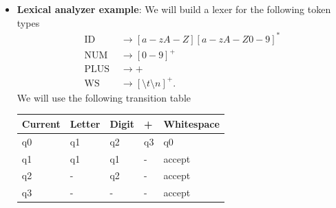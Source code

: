 \documentclass{report}
\begin{document}
\begin{itemize}
\begin{enumerate}
                \item Track the last accepting state
                \item When no transition is possible:
                    \begin{itemize}
                        \item Backtrack to last accepting state
                        \item Emit the corresponding token
                        \item Restart from next input position
                    \end{itemize}
            \end{enumerate}
            \textbf{Note:} You use a finite automaton to extract the tokens. The FA operations on raw characters.
            \begin{align*}
                \text{Char stream } \to \text{ FA } \to \text{ tokens} 
            .\end{align*}
            So the FA’s job is to recognize token boundaries, not to consume tokens. The outputs of the FA is the tokens.
        \item \textbf{Lexical analyzer example}: We will build a lexer for the following token types
            \begin{align*}
                \text{ID }    &\to [a-zA-Z][a-zA-Z0-9]^{*} \\
                \text{NUM }   &\to [0-9]^{+} \\
                \text{PLUS }  &\to + \\
                \text{WS }    &\to [ \setminus t\setminus n]^{+}
            .\end{align*}
            We will use the following transition table
            \begin{center}
                \begin{tabularx}{\textwidth}{@{}XXXXX@{}}
                    \toprule
                    \textbf{Current}	&\textbf{Letter}	&\textbf{Digit}	&+	&\textbf{Whitespace} \\
                    \midrule
                    q0	&q1	&q2	&q3	&q0 \\[2ex]
                    q1	&q1	&q1	&-	&accept\\[2ex]
                    q2	&-	&q2	&-	&accept\\[2ex]
                    q3	&-	&-	&-	&accept \\
                    \bottomrule
                \end{tabularx}

\end{center}
\end{itemize}
\end{document}
